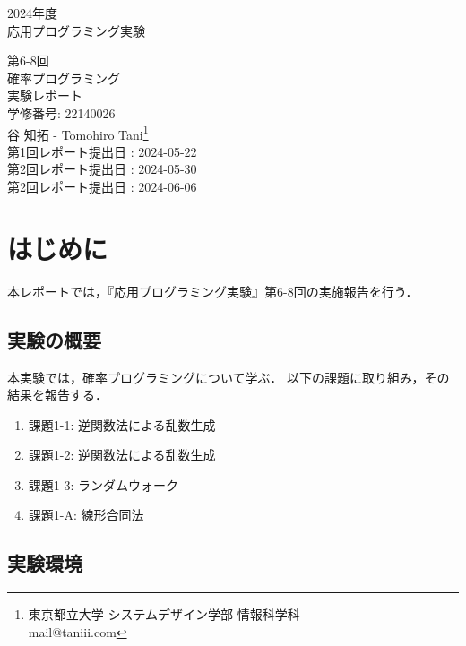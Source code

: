 \documentclass[fleqn, a4paper. 12pt]{jsarticle}
\begin{document}
  \begin{titlepage}
    \begin{center}
      {\Huge 2024年度\\応用プログラミング実験}
      
      \vspace{4cm}
      {\Huge 第6-8回\\確率プログラミング\\
        実験レポート\\
      }
      \vspace{4cm}
      {\large 学修番号: 22140026\\谷 知拓 - Tomohiro Tani\footnote{東京都立大学 システムデザイン学部 情報科学科 \\ mail@taniii.com} \\}
      \vspace{0.5cm}
      {\large
        第1回レポート提出日 : 2024-05-22 \\
        第2回レポート提出日 : 2024-05-30 \\
        第2回レポート提出日 : 2024-06-06 \\
      }
    \end{center}
  \end{titlepage}

  \section*{はじめに}

    本レポートでは，『応用プログラミング実験』第6-8回の実施報告を行う．

  \subsection*{実験の概要}

    本実験では，確率プログラミングについて学ぶ．
    以下の課題に取り組み，その結果を報告する．

    \begin{enumerate}
      \item 課題1-1: 逆関数法による乱数生成
      \item 課題1-2: 逆関数法による乱数生成
      \item 課題1-3: ランダムウォーク
      \item 課題1-A: 線形合同法
    \end{enumerate}

  \subsection*{実験環境}
\end{document}
